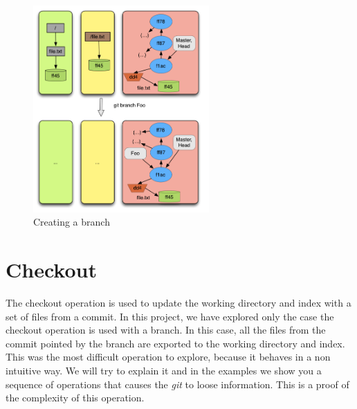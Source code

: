 \begin{figure}[!t]
   \centering
   \includegraphics[width=0.6\textwidth]{images/branch.png}
   \caption{Creating a branch}\label{fig:branch}
\end{figure}

\section{Checkout}
\label{sec:checkout}
The checkout operation is used to update the working directory and
index with a set of files from a commit. In this project, we have
explored only the case the checkout operation is used with a branch.
In this case, all the files from the commit pointed by the branch are
exported to the working directory and index. This was the most
difficult operation to explore, because it behaves in a non intuitive
way. We will try to explain it and in the examples we show you a
sequence of operations that causes the \emph{git} to loose
information. This is a proof of the complexity of this operation.


